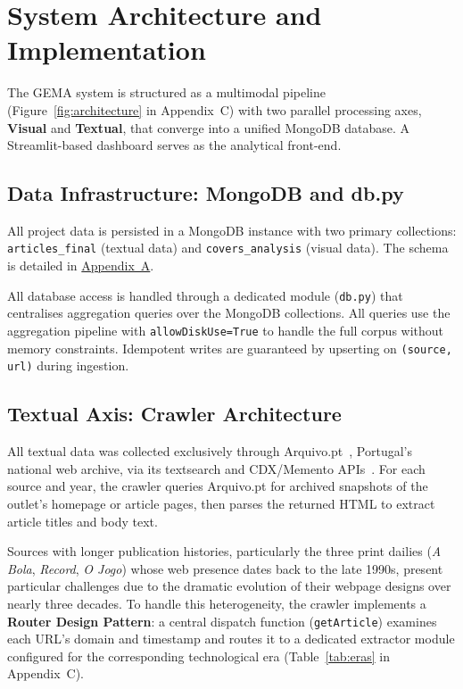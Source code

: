 \documentclass[11pt,a4paper]{article}
\begin{document}
\section{System Architecture and Implementation}
\label{sec:implementation}

The GEMA system is structured as a multimodal pipeline (Figure~\ref{fig:architecture} in Appendix~C) with two parallel processing axes, \textbf{Visual} and \textbf{Textual}, that converge into a unified MongoDB database. A Streamlit-based dashboard serves as the analytical front-end.

\subsection{Data Infrastructure: MongoDB and db.py}

All project data is persisted in a MongoDB instance with two primary collections: \texttt{articles\_final} (textual data) and \texttt{covers\_analysis} (visual data). The schema is detailed in \hyperref[app:schema]{Appendix~A}.

All database access is handled through a dedicated module (\texttt{db.py}) that centralises aggregation queries over the MongoDB collections. All queries use the aggregation pipeline with \texttt{allowDiskUse=True} to handle the full corpus without memory constraints. Idempotent writes are guaranteed by upserting on \texttt{(source, url)} during ingestion.

\subsection{Textual Axis: Crawler Architecture}
\label{sec:crawlers}

All textual data was collected exclusively through Arquivo.pt~\cite{Arquivo}, Portugal's national web archive, via its textsearch and CDX/Memento APIs~\cite{ArquivoAPI}. For each source and year, the crawler queries Arquivo.pt for archived snapshots of the outlet's homepage or article pages, then parses the returned HTML to extract article titles and body text.

Sources with longer publication histories, particularly the three print dailies (\textit{A Bola}, \textit{Record}, \textit{O Jogo}) whose web presence dates back to the late 1990s, present particular challenges due to the dramatic evolution of their webpage designs over nearly three decades. To handle this heterogeneity, the crawler implements a \textbf{Router Design Pattern}: a central dispatch function (\texttt{getArticle}) examines each URL's domain and timestamp and routes it to a dedicated extractor module configured for the corresponding technological era (Table~\ref{tab:eras} in Appendix~C).
\end{document}

